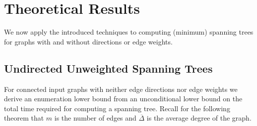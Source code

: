 \documentclass[a4paper, USenglish, cleveref, autoref, thm-restate]{lipics-v2021}
\newcommand{\avgdeg}{\overline{\Delta}}
\begin{document}
\section{Theoretical Results}

We now apply the introduced techniques to computing (minimum) spanning trees for graphs with and without directions or edge weights.

\subsection{Undirected Unweighted Spanning Trees}
\label{sec:uust}

For connected input graphs with neither edge directions nor edge weights we derive an enumeration lower bound from an unconditional lower bound on the total time required for computing a spanning tree.
Recall for the following theorem that $m$ is the number of edges and $\avgdeg$ is the average degree of the graph.
\end{document}

